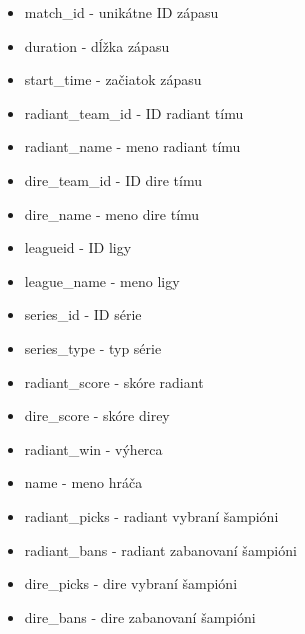 \begin{itemize}
\item match\_id - unikátne ID zápasu 
\item duration - dĺžka zápasu 
\item start\_time - začiatok zápasu 
\item radiant\_team\_id - ID radiant tímu 
\item radiant\_name - meno radiant tímu 
\item dire\_team\_id - ID dire tímu 
\item dire\_name - meno dire tímu 
\item leagueid - ID ligy
\item league\_name - meno ligy
\item series\_id - ID série
\item series\_type - typ série
\item radiant\_score - skóre radiant
\item dire\_score - skóre direy
\item radiant\_win - výherca
\item name - meno hráča
\item radiant\_picks - radiant vybraní šampióni
\item radiant\_bans - radiant zabanovaní šampióni
\item dire\_picks - dire vybraní šampióni
\item dire\_bans - dire zabanovaní šampióni
\end{itemize}

